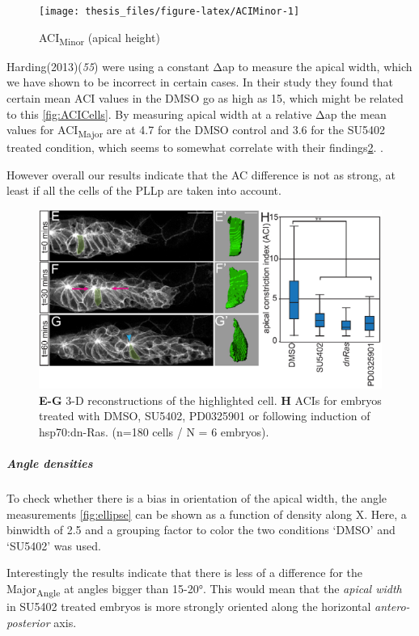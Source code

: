 \documentclass[11pt,singlespacinge,twoside]{reedthesis} %
\begin{document}
\begin{figure}

{\centering \texttt{[image: thesis\_files/figure-latex/ACIMinor-1]} 

}

\caption{ACI\textsubscript{Minor} (apical height)}\label{fig:ACIMinor}
\end{figure}
Harding(2013)(\emph{55}) were using a constant \(\mathrm{\Delta}\)ap to measure the apical width, which we have shown to be incorrect in certain cases. In their study they found that certain mean ACI values in the DMSO go as high as 15, which might be related to this \ref{fig:ACICells}.
By measuring apical width at a relative \(\mathrm{\Delta}\)ap the mean values for ACI\textsubscript{Major} are at 4.7 for the DMSO control and 3.6 for the SU5402 treated condition, which seems to somewhat correlate with their findings\ref{fig:HardingACI}. .

However overall our results indicate that the AC difference is not as strong, at least if all the cells of the PLLp are taken into account.


\begin{figure}

{\centering \includegraphics[width=0.6\linewidth]{figure/02-MaMo/GrTr/HardingACI} 

}

\caption[Published ACI]{\textbf{E-G} 3-D reconstructions of the highlighted cell. \textbf{H} ACIs for embryos treated with DMSO, SU5402, PD0325901 or following induction of hsp70:dn-Ras. (n=180 cells / N = 6 embryos).}\label{fig:HardingACI}
\end{figure}
\hypertarget{ACI-Angledens}{%
\subparagraph{Angle densities}\label{ACI-Angledens}}

To check whether there is a bias in orientation of the apical width, the angle measurements \ref{fig:ellipse} can be shown as a function of density along X. Here, a binwidth of 2.5 and a grouping factor to color the two conditions `DMSO' and `SU5402' was used.

\noindent Interestingly the results indicate that there is less of a difference for the Major\textsubscript{Angle} at angles bigger than 15-20°. This would mean that the \emph{apical width} in SU5402 treated embryos is more strongly oriented along the horizontal \emph{antero-posterior} axis.
\end{document}
